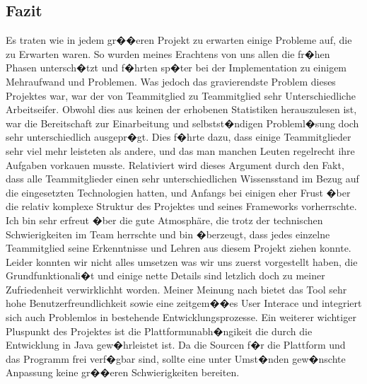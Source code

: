 \subsection{Fazit}

Es traten wie in jedem gr��eren Projekt zu erwarten einige Probleme auf, die zu Erwarten waren. So wurden meines Erachtens von uns allen die fr�hen Phasen untersch�tzt und f�hrten sp�ter bei der Implementation zu einigem Mehraufwand und Problemen. Was jedoch das gravierendste Problem dieses Projektes war, war der von Teammitglied zu Teammitglied sehr Unterschiedliche Arbeitseifer. Obwohl dies aus keinen der erhobenen Statistiken herauszulesen ist, war die Bereitschaft zur Einarbeitung und selbstst�ndigen Probleml�sung doch sehr unterschiedlich ausgepr�gt. Dies f�hrte dazu, dass einige Teammitglieder sehr viel mehr leisteten als andere, und das man manchen Leuten regelrecht ihre Aufgaben vorkauen musste. Relativiert wird dieses Argument durch den Fakt, dass alle Teammitglieder einen sehr unterschiedlichen Wissensstand im Bezug auf die eingesetzten Technologien hatten, und Anfangs bei einigen eher Frust �ber die relativ komplexe Struktur des Projektes und seines Frameworks vorherrschte. 
Ich bin sehr erfreut �ber die gute Atmosphäre, die trotz der technischen Schwierigkeiten im Team herrschte und bin �berzeugt, dass jedes einzelne Teammitglied seine Erkenntnisse und Lehren aus diesem Projekt ziehen konnte. Leider konnten wir  nicht alles umsetzen was wir uns zuerst vorgestellt haben, die Grundfunktionali�t und einige nette Details sind letzlich doch zu meiner Zufriedenheit verwirklichht worden. Meiner Meinung nach bietet das Tool sehr hohe Benutzerfreundlichkeit sowie eine zeitgem��es User Interace und integriert sich auch Problemlos in bestehende Entwicklungsprozesse. Ein weiterer wichtiger Pluspunkt des Projektes ist die Plattformunabh�ngikeit die durch die Entwicklung in Java gew�hrleistet ist. Da die Sourcen f�r die Plattform und das Programm frei verf�gbar sind, sollte eine unter Umst�nden gew�nschte Anpassung keine gr��eren Schwierigkeiten bereiten.